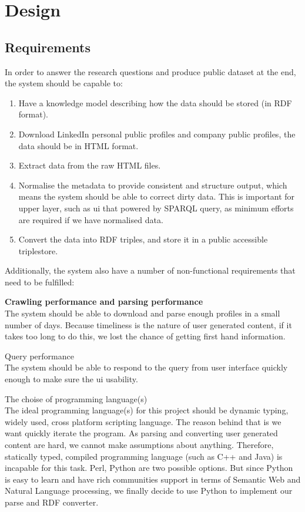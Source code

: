 \chapter{Design}

\section{Requirements}
In order to answer the research questions and produce public dataset at the end, the system should be capable to:
\begin{enumerate}
	\item Have a knowledge model describing how the data should be stored (in RDF format).
	\item Download LinkedIn personal public profiles and company public profiles, the data should be in HTML format.
	\item Extract data from the raw HTML files.
	\item Normalise the metadata to provide consistent and structure output, which means the system should be able to correct dirty data. This is important for upper layer, such as \gls{ui} that powered by SPARQL query, as minimum efforts are required if we have normalised data.
	\item Convert the data into RDF triples, and store it in a public accessible triplestore.
\end{enumerate}

Additionally, the system also have a number of non-functional requirements that need to be fulfilled:

\begin{description}
	\item \textbf{Crawling performance and parsing performance} \hfill \\
	The system should be able to download and parse enough profiles in a small number of days. Because timeliness is the nature of user generated content, if it takes too long to do this, we lost the chance of getting first hand information.
	\item Query performance \hfill \\
	The system should be able to respond to the query from user interface quickly enough to make sure the \gls{ui} usability.
	\item The choise of programming language(s) \hfill \\
	The ideal programming language(s) for this project should be dynamic typing, widely used, cross platform scripting language. The reason behind that is we want quickly iterate the program. As parsing and converting user generated content are hard, we cannot make assumptions about anything. Therefore, statically typed, compiled programming language (such as C++ and Java) is incapable for this task. Perl, Python are two possible options. But since Python is easy to learn and have rich communities support in terms of Semantic Web and Natural Language processing, we finally decide to use Python to implement our parse and RDF converter.
\end{description}


